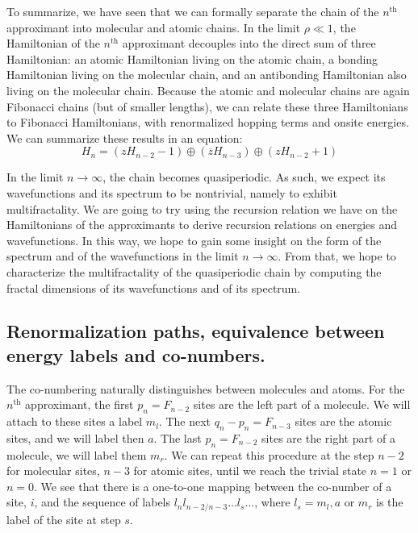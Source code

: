 \documentclass[11pt]{article}
\newcommand{\zb}{\ensuremath{\overline{z}}}
\begin{document}
To summarize, we have seen that we can formally separate the chain of the $n^\text{th}$ approximant into molecular and atomic chains.
In the limit $\rho \ll 1$, the Hamiltonian of the $n^\text{th}$ approximant decouples into the direct sum of three Hamiltonian: an atomic Hamiltonian living on the atomic chain, a bonding Hamiltonian living on the molecular chain, and an antibonding Hamiltonian also living on the molecular chain. 
Because the atomic and molecular chains are again Fibonacci chains (but of smaller lengths), we can relate these three Hamiltonians to Fibonacci Hamiltonians, with renormalized hopping terms and onsite energies.
We can summarize these results in an equation:
\begin{equation}
	H_n = \left( z H_{n-2} - 1 \right) \oplus \left( \zb H_{n-3} \right) \oplus \left( z H_{n-2} + 1 \right) 
\end{equation}

In the limit $n \rightarrow \infty$, the chain becomes quasiperiodic. As such, we expect its wavefunctions and its spectrum to be nontrivial, namely to exhibit multifractality.
We are going to try using the recursion relation we have on the Hamiltonians of the approximants to derive recursion relations on energies and wavefunctions. In this way, we hope to gain some insight on the form of the spectrum and of the wavefunctions in the limit $n \rightarrow \infty$.
From that, we hope to characterize the multifractality of the quasiperiodic chain by computing the fractal dimensions of its wavefunctions and of its spectrum.

\subsection{Renormalization paths, equivalence between energy labels and co-numbers.}

The co-numbering naturally distinguishes between molecules and atoms.
For the $n^\text{th}$ approximant, the first $p_n = F_{n-2}$ sites are the left part of a molecule. We will attach to these sites a label $m_l$. The next $q_n - p_n = F_{n-3}$ sites are the atomic sites, and we will label then $a$. The last $p_n = F_{n-2}$ sites are the right part of a molecule, we will label them $m_r$.
We can repeat this procedure at the step $n-2$ for molecular sites, $n-3$ for atomic sites, until we reach the trivial state $n=1$ or $n=0$. 
We see that there is a one-to-one mapping between the co-number of a site, $i$, and the sequence of labels $l_n l_{n-2/n-3} \dots l_s \dots$, where $l_s = m_l, a$ or $m_r$ is the label of the site at step $s$.
\end{document}
